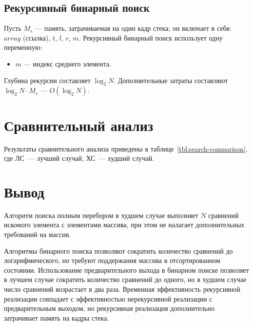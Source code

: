 \subsection{Рекурсивный бинарный поиск}
Пусть $M_s$ --- память, затрачиваемая на один кадр стека; он включает в себя: $array$ (ссылка), $t$, $l$, $r$, $m$. 
Рекурсивный бинарный поиск использует одну переменную:
\begin{itemize}
	\item $m$ --- индекс среднего элемента.
\end{itemize}
Глубина рекурсии составляет $\log_2N$.
Дополнительные затраты составляют $\log_2N \cdot M_s$ --- $O(\log_2N)$.

\section{Сравнительный анализ}
Результаты сравнительного анализа приведены в таблице~\ref{tbl:search-comparison}, где ЛС~--- лучший случай, ХС~--- худший случай.

\section{Вывод}
Алгоритм поиска полным перебором в худшем случае выполняет $N$ сравнений искомого элемента с элементами массива, при этом не налагает дополнительных требований на массив. 

Алгоритмы бинарного поиска позволяют сократить количество сравнений до логарифмического, но требуют поддержания массива в отсортированном состоянии. Использование предварительного выхода в бинарном поиске позволяет в лучшем случае сократить количество сравнений до одного, но в худшем случае число сравнений возрастает в два раза. Временная эффективность рекурсивной реализации совпадает с эффективностью нерекурсивной реализации с предварительным выходом, но рекурсивная реализация дополнительно затрачивает память на кадры стека.